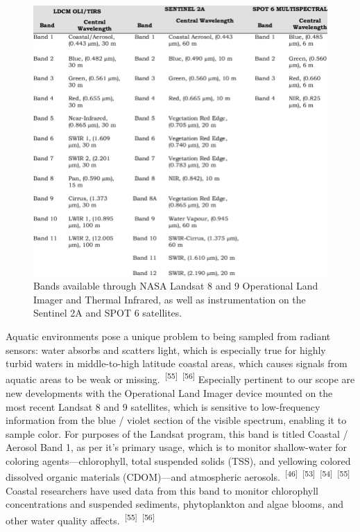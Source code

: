 \documentclass{article}
\begin{document}
\begin{figure}
    \centering
    \includegraphics[width=0.7\linewidth]{images/landsat-8-specs.png}
    \caption{Bands available through NASA Landsat 8 and 9 Operational Land Imager and Thermal Infrared, as well as instrumentation on the Sentinel 2A and SPOT 6 satellites.}
    \label{figure13}
\end{figure}

\par{Aquatic environments pose a unique problem to being sampled from radiant sensors: water absorbs and scatters light, which is especially true for highly turbid waters in middle-to-high latitude coastal areas, which causes signals from aquatic areas to be weak or missing.~\textsuperscript{[55]}~\textsuperscript{[56]} Especially pertinent to our scope are new developments with the Operational Land Imager device mounted on the most recent Landsat 8 and 9 satellites, which is sensitive to low-frequency information from the blue / violet section of the visible spectrum, enabling it to sample color. For purposes of the Landsat program, this band is titled Coastal / Aerosol Band 1, as per it's primary usage, which is to monitor shallow-water for coloring agents---chlorophyll, total suspended solids (TSS), and yellowing colored dissolved organic materials (CDOM)---and atmospheric aerosols.~\textsuperscript{[46]}~\textsuperscript{[53]}~\textsuperscript{[54]}~\textsuperscript{[55]} Coastal researchers have used data from this band to monitor chlorophyll concentrations and suspended sediments, phytoplankton and algae blooms, and other water quality affects.~\textsuperscript{[55]}~\textsuperscript{[56]}}
\end{document}

